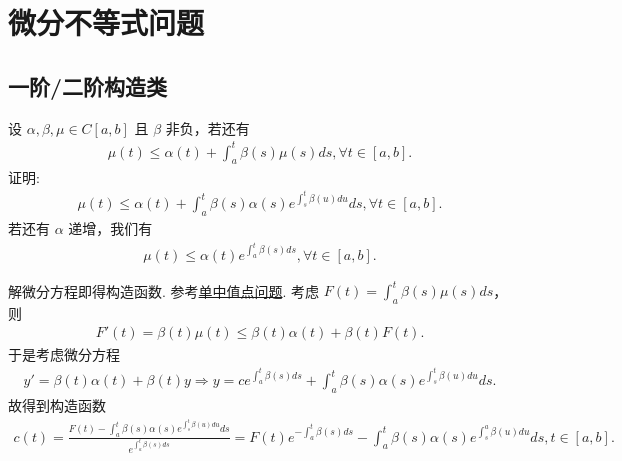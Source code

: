 \documentclass[../../main.tex]{subfiles}
\begin{document}
\section{微分不等式问题}

\subsection{一阶/二阶构造类}

\begin{example}[$\,\,$Gronwall不等式]\label{example:Gronwall不等式}
设 $\alpha,\beta,\mu\in C[a,b]$ 且 $\beta$ 非负，若还有
\begin{align}
\mu(t)\leqslant\alpha(t)+\int_{a}^{t}\beta(s)\mu(s)ds,\forall t\in[a,b].
\label{equation---12.6}
\end{align}
证明:
\begin{align*}
\mu(t)\leqslant\alpha(t)+\int_{a}^{t}\beta(s)\alpha(s)e^{\int_{s}^{t}\beta(u)du}ds,\forall t\in[a,b].
\end{align*}
若还有 $\alpha$ 递增，我们有
\begin{align*}
\mu(t)\leqslant\alpha(t)e^{\int_{a}^{t}\beta(s)ds},\forall t\in[a,b].
\end{align*}
\end{example}
\begin{note}
解微分方程即得构造函数. 参考\hyperref[section单中值点问题]{单中值点问题}. 考虑 $F(t)=\int_{a}^{t}\beta(s)\mu(s)ds$，则
\begin{align*}
F'(t)=\beta(t)\mu(t)\leqslant\beta(t)\alpha(t)+\beta(t)F(t).
\end{align*}
于是考虑微分方程
\begin{align*}
y'=\beta(t)\alpha(t)+\beta(t)y\Rightarrow y=ce^{\int_{a}^{t}\beta(s)ds}+\int_{a}^{t}\beta(s)\alpha(s)e^{\int_{s}^{t}\beta(u)du}ds.
\end{align*}
故得到构造函数
\begin{align*}
c(t)=\frac{F(t)-\int_{a}^{t}\beta(s)\alpha(s)e^{\int_{s}^{t}\beta(u)du}ds}{e^{\int_{a}^{t}\beta(s)ds}}=F(t)e^{-\int_{a}^{t}\beta(s)ds}-\int_{a}^{t}\beta(s)\alpha(s)e^{\int_{s}^{a}\beta(u)du}ds,t\in[a,b].
\end{align*} 
\end{note}
\end{document}
